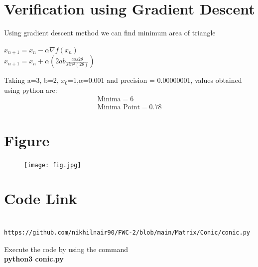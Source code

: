 \documentclass[journal,12pt,twocolumn]{IEEEtran}
\begin{document}
\section{\textbf{Verification using Gradient Descent}}

Using gradient descent method we can find minimum area of triangle\\ \vspace{2mm}
\begin{center}
$x_{n+1} = x_n - \alpha \nabla f(x_n)$ 
\\

\vspace{7mm}
$x_{n+1} = x_n + \alpha (2ab\frac{cos2\theta}{sin^2(2\theta)})$
\end{center}
\vspace{7mm}
Taking a=3, b=2, $x_0$=1,$\alpha$=0.001 and precision = 0.00000001, values obtained using python are:
\\
    
\begin{align}
        \boxed{\text{Minima} = 6}\\
        \boxed{\text{Minima Point} = 0.78}
\end{align}
\vspace{1mm}
\section{\textbf{Figure}}
\begin{figure}[h]
    \centering
\texttt{[image: fig.jpg]}
    \label{fig:my_label}
\end{figure}


\section{\textbf{Code Link}}

\begin{lstlisting}

https://github.com/nikhilnair90/FWC-2/blob/main/Matrix/Conic/conic.py

\end{lstlisting}
Execute the code by using the command\\
\textbf{python3 conic.py}
\end{document}

